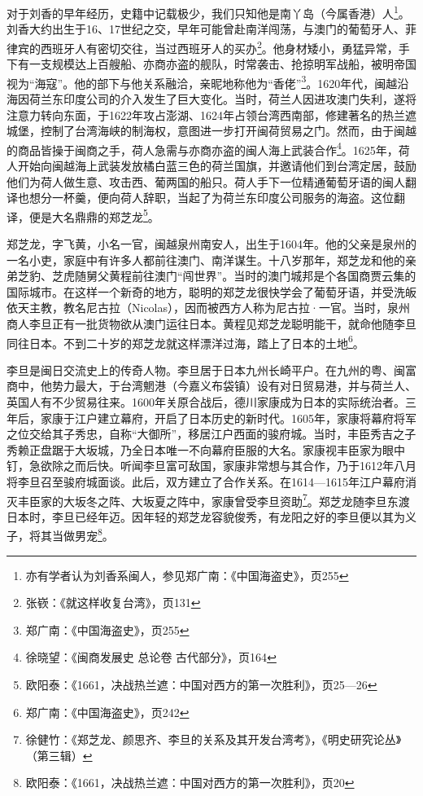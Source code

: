 对于刘香的早年经历，史籍中记载极少，我们只知他是南丫岛（今属香港）人\footnote{亦有学者认为刘香系闽人，参见郑广南：《中国海盗史》，页255}。刘香大约出生于16、17世纪之交，早年可能曾赴南洋闯荡，与澳门的葡萄牙人、菲律宾的西班牙人有密切交往，当过西班牙人的买办\footnote{张嵚：《就这样收复台湾》，页131}。他身材矮小，勇猛异常，手下有一支规模达上百艘船、亦商亦盗的舰队，时常袭击、抢掠明军战船，被明帝国视为“海寇”。他的部下与他关系融洽，亲昵地称他为“香佬”\footnote{郑广南：《中国海盗史》，页255}。1620年代，闽越沿海因荷兰东印度公司的介入发生了巨大变化。当时，荷兰人因进攻澳门失利，遂将注意力转向东面，于1622年攻占澎湖、1624年占领台湾西南部，修建著名的热兰遮城堡，控制了台湾海峡的制海权，意图进一步打开闽荷贸易之门。然而，由于闽越的商品皆操于闽商之手，荷人急需与亦商亦盗的闽人海上武装合作\footnote{徐晓望：《闽商发展史 总论卷 古代部分》，页164}。1625年，荷人开始向闽越海上武装发放橘白蓝三色的荷兰国旗，并邀请他们到台湾定居，鼓励他们为荷人做生意、攻击西、葡两国的船只。荷人手下一位精通葡萄牙语的闽人翻译也想分一杯羹，便向荷人辞职，当起了为荷兰东印度公司服务的海盗。这位翻译，便是大名鼎鼎的郑芝龙\footnote{欧阳泰：《1661，决战热兰遮：中国对西方的第一次胜利》，页25—26}。

郑芝龙，字飞黄，小名一官，闽越泉州南安人，出生于1604年。他的父亲是泉州的一名小吏，家庭中有许多人都前往澳门、南洋谋生。十八岁那年，郑芝龙和他的亲弟芝豹、芝虎随舅父黄程前往澳门“闯世界”。当时的澳门城邦是个各国商贾云集的国际城市。在这样一个新奇的地方，聪明的郑芝龙很快学会了葡萄牙语，并受洗皈依天主教，教名尼古拉（Nicolas），因而被西方人称为尼古拉·一官。当时，泉州商人李旦正有一批货物欲从澳门运往日本。黄程见郑芝龙聪明能干，就命他随李旦同往日本。不到二十岁的郑芝龙就这样漂洋过海，踏上了日本的土地\footnote{郑广南：《中国海盗史》，页242}。

李旦是闽日交流史上的传奇人物。李旦居于日本九州长崎平户。在九州的粤、闽富商中，他势力最大，于台湾魍港（今嘉义布袋镇）设有对日贸易港，并与荷兰人、英国人有不少贸易往来。1600年关原合战后，德川家康成为日本的实际统治者。三年后，家康于江户建立幕府，开启了日本历史的新时代。1605年，家康将幕府将军之位交给其子秀忠，自称“大御所”，移居江户西面的骏府城。当时，丰臣秀吉之子秀赖正盘踞于大坂城，乃全日本唯一不向幕府臣服的大名。家康视丰臣家为眼中钉，急欲除之而后快。听闻李旦富可敌国，家康非常想与其合作，乃于1612年八月将李旦召至骏府城面谈。此后，双方建立了合作关系。在1614—1615年江户幕府消灭丰臣家的大坂冬之阵、大坂夏之阵中，家康曾受李旦资助\footnote{徐健竹：《郑芝龙、颜思齐、李旦的关系及其开发台湾考》，《明史研究论丛》（第三辑）}。郑芝龙随李旦东渡日本时，李旦已经年迈。因年轻的郑芝龙容貌俊秀，有龙阳之好的李旦便以其为义子，将其当做男宠\footnote{欧阳泰：《1661，决战热兰遮：中国对西方的第一次胜利》，页20}。

